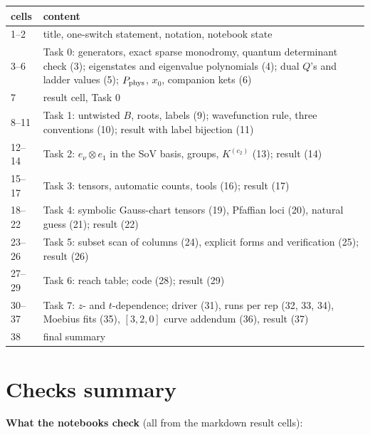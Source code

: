 \documentclass[10pt]{article}
\begin{document}
\begin{center}\small\setlength{\tabcolsep}{3pt}\begin{longtable}{@{}lp{12cm}@{}}\toprule
\textbf{cells} & \textbf{content} \\\midrule\endhead
1--2 & title, one-switch statement, notation, notebook state \\
3--6 & Task 0: generators, exact sparse monodromy, quantum determinant check (3); eigenstates and eigenvalue polynomials (4); dual $Q$'s and ladder values (5); $P_{\rm phys}$, $x_0$, companion kets (6) \\
7 & result cell, Task 0 \\
8--11 & Task 1: untwisted $B$, roots, labels (9); wavefunction rule, three conventions (10); result with label bijection (11) \\
12--14 & Task 2: $e_\nu\otimes e_1$ in the SoV basis, groups, $K^{(c_2)}$ (13); result (14) \\
15--17 & Task 3: tensors, automatic counts, tools (16); result (17) \\
18--22 & Task 4: symbolic Gauss-chart tensors (19), Pfaffian loci (20), natural guess (21); result (22) \\
23--26 & Task 5: subset scan of columns (24), explicit forms and verification (25); result (26) \\
27--29 & Task 6: reach table; code (28); result (29) \\
30--37 & Task 7: $z$- and $t$-dependence; driver (31), runs per rep (32, 33, 34), Moebius fits (35), $[3,2,0]$ curve addendum (36), result (37) \\
38 & final summary \\
\bottomrule\end{longtable}\end{center}

\section{Checks summary}\label{app:checks}

\textbf{What the notebooks check} (all from the markdown result cells):
\end{document}
